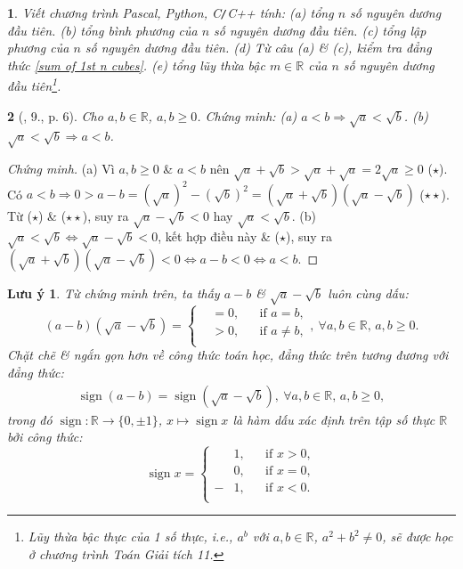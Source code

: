 \documentclass{article}
\newtheorem{baitoan}{}%
\newtheorem{luuy}{Lưu ý}
\begin{document}
\begin{baitoan}
	Viết chương trình {\sf Pascal, Python, C\texttt{/}C++} tính: (a) tổng $n$ số nguyên dương đầu tiên. (b) tổng bình phương của $n$ số nguyên dương đầu tiên. (c) tổng lập phương của $n$ số nguyên dương đầu tiên. (d) Từ câu (a) \& (c), kiểm tra đẳng thức \eqref{sum of 1st n cubes}. (e) tổng lũy thừa bậc $m\in\mathbb{R}$ của $n$ số nguyên dương đầu tiên\footnote{Lũy thừa bậc thực của 1 số thực, i.e., $a^b$ với $a,b\in\mathbb{R}$, $a^2 + b^2\ne0$, sẽ được học ở chương trình Toán Giải tích 11.}.
\end{baitoan}

\begin{baitoan}[\cite{SBT_Toan_9_tap_1}, 9., p. 6]
	\label{SBT Toan 9 tap 1 9 p. 6}
	Cho $a,b\in\mathbb{R}$, $a,b\ge0$. Chứng minh: (a) $a < b\Rightarrow\sqrt{a} < \sqrt{b}$. (b) $\sqrt{a} < \sqrt{b}\Rightarrow a < b$. 
\end{baitoan}

\begin{proof}[Chứng minh]
	(a) Vì $a,b\ge0$ \& $a < b$ nên $\sqrt{a} + \sqrt{b} > \sqrt{a} + \sqrt{a} = 2\sqrt{a}\ge0$ ($\star$). Có $a < b\Rightarrow0 > a - b = (\sqrt{a})^2 - (\sqrt{b})^2 = (\sqrt{a} + \sqrt{b})(\sqrt{a} - \sqrt{b})$ ($\star\star$). Từ ($\star$) \& ($\star\star$), suy ra $\sqrt{a} - \sqrt{b} < 0$ hay  $\sqrt{a} < \sqrt{b}$. (b) $\sqrt{a} < \sqrt{b}\Leftrightarrow\sqrt{a} - \sqrt{b} < 0$, kết hợp điều này \& ($\star$), suy ra $(\sqrt{a} + \sqrt{b})(\sqrt{a} - \sqrt{b}) < 0\Leftrightarrow a - b < 0\Leftrightarrow a < b$.
\end{proof}

\begin{luuy}
	Từ chứng minh trên, ta thấy
	$a - b$ \& $\sqrt{a} - \sqrt{b}$ luôn cùng dấu:
	\begin{equation*}
		(a - b)(\sqrt{a} - \sqrt{b}) = \left\{\begin{split}
			&= 0,&&\mbox{if } a = b,\\
			&> 0,&&\mbox{if } a\ne b,\\
		\end{split}\right.,\ \forall a,b\in\mathbb{R},\,a,b\ge0.
	\end{equation*}
	Chặt chẽ \& ngắn gọn hơn về công thức toán học, đẳng thức trên tương đương với đẳng thức:
	\begin{align*}
		\operatorname{sign}(a - b) = \operatorname{sign}(\sqrt{a} - \sqrt{b}),\ \forall a,b\in\mathbb{R},\,a,b\ge0,
	\end{align*}
	trong đó $\operatorname{sign}:\mathbb{R}\to\{0,\pm1\}$, $x\mapsto\operatorname{sign}x$ là \emph{hàm dấu} xác định trên tập số thực $\mathbb{R}$ bởi công thức:
	\begin{equation*}
		\operatorname{sign}x = \left\{\begin{split}
			&1,&&\mbox{if } x > 0,\\
			&0,&&\mbox{if } x = 0,\\
			-&1,&&\mbox{if } x < 0.\\
		\end{split}\right.
	\end{equation*}
\end{luuy}
\end{document}
